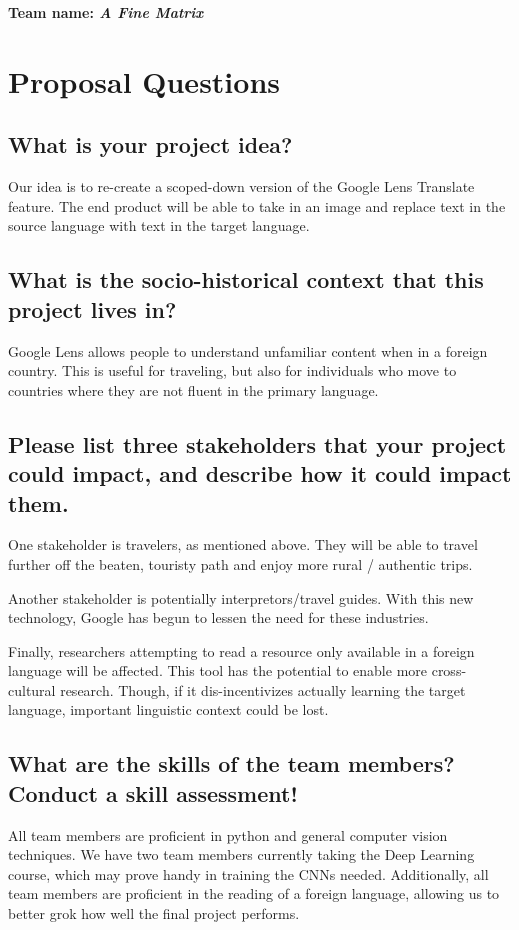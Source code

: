 \textbf{Team name: \emph{A Fine Matrix}}


\section*{Proposal Questions}

\subsection*{What is your project idea?}
Our idea is to re-create a scoped-down version of the Google Lens Translate feature. 
The end product will be able to take in an image and replace text in the source language with text in the target language.

\subsection*{What is the socio-historical context that this project lives in? }
Google Lens allows people to understand unfamiliar content when in a foreign country. 
This is useful for traveling, but also for individuals who move to countries where they are not fluent in the primary language.

\subsection*{Please list three stakeholders that your project could impact, and describe how it could impact them.}
One stakeholder is travelers, as mentioned above. 
They will be able to travel further off the beaten, touristy path and enjoy more rural / authentic trips.

Another stakeholder is potentially interpretors/travel guides. 
With this new technology, Google has begun to lessen the need for these industries.

Finally, researchers attempting to read a resource only available in a foreign language will be affected.
This tool has the potential to enable more cross-cultural research. 
Though, if it dis-incentivizes actually learning the target language, important linguistic context could be lost.

\subsection*{What are the skills of the team members? Conduct a skill assessment!}

All team members are proficient in python and general computer vision techniques. 
We have two team members currently taking the Deep Learning course, which may prove handy in training the CNNs needed.
Additionally, all team members are proficient in the reading of a foreign language, allowing us to better grok how well the final project performs.

